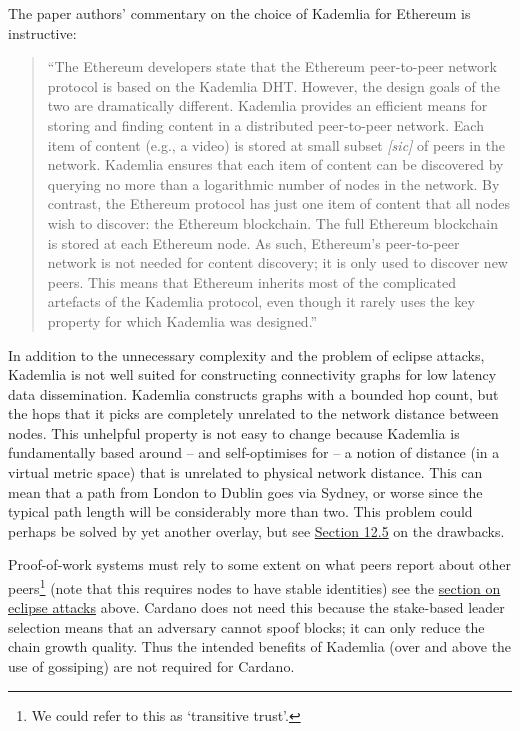 \documentclass[]{article}
\begin{document}
The paper authors' commentary on the choice of Kademlia for Ethereum is
instructive:

\begin{quote}
``The Ethereum developers state that the Ethereum peer-to-peer network
protocol is based on the Kademlia DHT. However, the design goals of the
two are dramatically different. Kademlia provides an efficient means for
storing and finding content in a distributed peer-to-peer network. Each
item of content (e.g., a video) is stored at small subset
\emph{{[}sic{]}} of peers in the network. Kademlia ensures that each
item of content can be discovered by querying no more than a logarithmic
number of nodes in the network. By contrast, the Ethereum protocol has
just one item of content that all nodes wish to discover: the Ethereum
blockchain. The full Ethereum blockchain is stored at each Ethereum
node. As such, Ethereum's peer-to-peer network is not needed for content
discovery; it is only used to discover new peers. This means that
Ethereum inherits most of the complicated artefacts of the Kademlia
protocol, even though it rarely uses the key property for which Kademlia
was designed.''
\end{quote}

In addition to the unnecessary complexity and the problem of eclipse
attacks, Kademlia is not well suited for constructing connectivity
graphs for low latency data dissemination. Kademlia constructs graphs
with a bounded hop count, but the hops that it picks are completely
unrelated to the network distance between nodes. This unhelpful property
is not easy to change because Kademlia is fundamentally based around --
and self-optimises for -- a notion of distance (in a virtual metric
space) that is unrelated to physical network distance. This can mean
that a path from London to Dublin goes via Sydney, or worse since the
typical path length will be considerably more than two. This problem
could perhaps be solved by yet another overlay, but see
\protect\hyperlink{comparison-with-general-overlay-networks}{{Section
12.5}} on the drawbacks.

Proof-of-work systems must rely to some extent on what peers report
about other peers\footnote{We could refer to this as `transitive trust'.}
(note that this requires nodes to have stable identities) see the
\protect\hyperlink{eclipse-attacks}{{section on eclipse attacks}} above.
Cardano does not need this because the stake-based leader selection
means that an adversary cannot spoof blocks; it can only reduce the
chain growth quality. Thus the intended benefits of Kademlia (over and
above the use of gossiping) are not required for Cardano.
\end{document}

